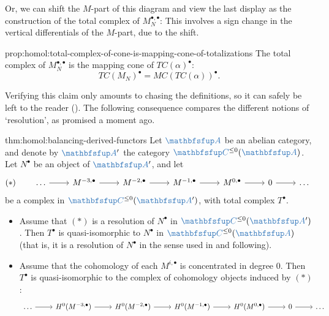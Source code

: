 Or, we can shift the $M$-part of this diagram and view the last
display as the construction of the total complex of
$M_N^{\bullet,\bullet}$:
This involves a sign change in the vertical differentials of the
$M$-part, due to the shift.

\begin{prop}{}{prop:homol:total-complex-of-cone-is-mapping-cone-of-totalizations}
  The total complex of $M_N^{\bullet,\bullet}$ is the mapping cone of
  $TC(\alpha)^\bullet$:
  \[
    TC(M_N)^\bullet = MC(TC(\alpha))^\bullet.
  \]
\end{prop}

Verifying this claim only amounts to chasing the definitions, so it
can safely be left to the reader
(). The following
consequence compares the different notions of `resolution', as
promised a moment ago.

\begin{thm}{}{thm:homol:balancing-derived-functors}
  Let $\categ{A}$ be an abelian category, and denote by $\categ{A}'$
  the category $\categ{C}^{\le 0}(\categ{A})$. Let $N^\bullet$ be an
  object of $\categ{A}'$, and let
  \[
    (*) \qquad
    \begin{tikzcd}
      \dots \arrow[r] & M^{-3,\bullet} \arrow[r] & M^{-2,\bullet}
      \arrow[r] & M^{-1,\bullet} \arrow[r] & M^{0,\bullet} \arrow[r] &
      0 \arrow[r] & \dots
    \end{tikzcd}
  \]
  be a complex in $\categ{C}^{\le 0}(\categ{A}')$, with total complex
  $T^\bullet$.
  \begin{itemize}
  \item Assume that $(*)$ is a resolution of $N^\bullet$ in
    $\categ{C}^{\le 0}(\categ{A}')$. Then $T^\bullet$ is
    quasi-isomorphic to $N^\bullet$ in $\categ{C}^{\le 0}(\categ{A})$
    (that is, it is a resolution of $N^\bullet$ in the sense used in
     and following).
  \item Assume that the cohomology of each $M^{i,\bullet}$ is
    concentrated in degree $0$. Then $T^\bullet$ is quasi-isomorphic
    to the complex of cohomology objects induced by $(*)$:
    \[\begin{tikzcd}
        \dots \arrow[r] & H^0(M^{-3,\bullet}) \arrow[r] &
        H^0(M^{-2,\bullet}) \arrow[r] & H^0(M^{-1,\bullet}) \arrow[r]
        & H^0(M^{0,\bullet}) \arrow[r] & 0 \arrow[r] & \dots
      \end{tikzcd}\]
  \end{itemize}
\end{thm}

